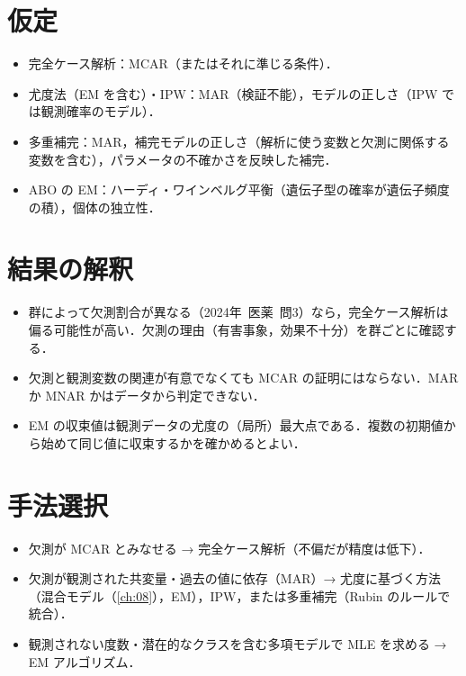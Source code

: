 \documentclass[a4paper,11pt,openany]{ltjsbook}
\newcommand{\kakomon}[2]{\mbox{#1年 医薬 問#2}}
\begin{document}
\section{仮定}\label{sec:16-assump}
\begin{itemize}
\item 完全ケース解析：MCAR（またはそれに準じる条件）．
\item 尤度法（EM を含む）・IPW：MAR（検証不能），モデルの正しさ（IPW では観測確率のモデル）．
\item 多重補完：MAR，補完モデルの正しさ（解析に使う変数と欠測に関係する変数を含む），パラメータの不確かさを反映した補完．
\item ABO の EM：ハーディ・ワインベルグ平衡（遺伝子型の確率が遺伝子頻度の積），個体の独立性．
\end{itemize}

\section{結果の解釈}\label{sec:16-interp}
\begin{itemize}
\item 群によって欠測割合が異なる（\kakomon{2024}{3}）なら，完全ケース解析は偏る可能性が高い．欠測の理由（有害事象，効果不十分）を群ごとに確認する．
\item 欠測と観測変数の関連が有意でなくても MCAR の証明にはならない．MAR か MNAR かはデータから判定できない．
\item EM の収束値は観測データの尤度の（局所）最大点である．複数の初期値から始めて同じ値に収束するかを確かめるとよい．
\end{itemize}

\section{手法選択}\label{sec:16-choice}
\begin{itemize}
\item 欠測が MCAR とみなせる → 完全ケース解析（不偏だが精度は低下）．
\item 欠測が観測された共変量・過去の値に依存（MAR）→ 尤度に基づく方法（混合モデル（\cref{ch:08}），EM），IPW，または多重補完（Rubin のルールで統合）．
\item 観測されない度数・潜在的なクラスを含む多項モデルで MLE を求める → EM アルゴリズム．
\end{itemize}
\end{document}
